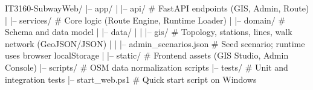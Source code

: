 IT3160-SubwayWeb/
|-- app/
|   |-- api/                # FastAPI endpoints (GIS, Admin, Route)
|   |-- services/           # Core logic (Route Engine, Runtime Loader)
|   |-- domain/             # Schema and data model
|   |-- data/
|   |   |-- gis/            # Topology, stations, lines, walk network (GeoJSON/JSON)
|   |   |-- admin_scenarios.json # Seed scenario; runtime uses browser localStorage
|   |-- static/             # Frontend assets (GIS Studio, Admin Console)
|-- scripts/                # OSM data normalization scripts
|-- tests/                  # Unit and integration tests
|-- start_web.ps1           # Quick start script on Windows
